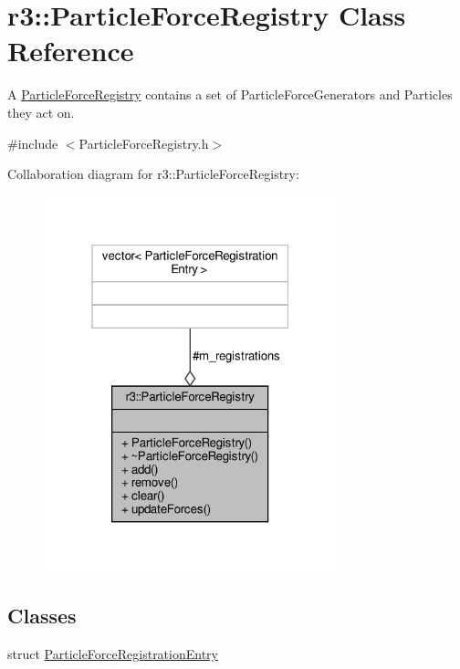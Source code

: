 \hypertarget{classr3_1_1_particle_force_registry}{}\section{r3\+:\+:Particle\+Force\+Registry Class Reference}
\label{classr3_1_1_particle_force_registry}


A \mbox{\hyperlink{classr3_1_1_particle_force_registry}{Particle\+Force\+Registry}} contains a set of Particle\+Force\+Generators and Particles they act on.  




{\ttfamily \#include $<$Particle\+Force\+Registry.\+h$>$}



Collaboration diagram for r3\+:\+:Particle\+Force\+Registry\+:\nopagebreak
\begin{figure}[H]
\begin{center}
\leavevmode
\includegraphics[width=241pt]{classr3_1_1_particle_force_registry__coll__graph}
\end{center}
\end{figure}
\subsection*{Classes}
\begin{DoxyCompactItemize}
\item 
struct \mbox{\hyperlink{structr3_1_1_particle_force_registry_1_1_particle_force_registration_entry}{Particle\+Force\+Registration\+Entry}}
\end{DoxyCompactItemize}
